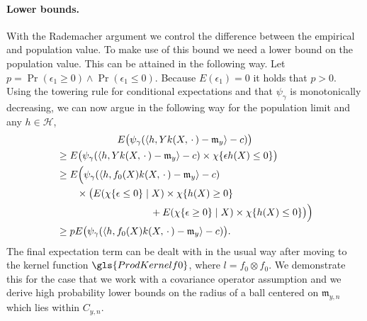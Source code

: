 \documentclass[10pt]{amsart}
\theoremstyle{definition}\newtheorem{defi}[theo]{Definition}\newtheorem{rema}[theo]{Remark}\newtheorem{exam}[theo]{Example}\newtheorem{exem}[theo]{Example}\newtheorem{nota}[theo]{Notation}
\theoremstyle{remark}
\newcommand{\cH}{\mathcal{H}}
\newcommand{\mean}{\mathfrak{m}}
\begin{document}
\paragraph{Lower bounds.} With the Rademacher argument we control the difference between the empirical and population value. To make use of this bound we need a lower bound on the population value. This can be attained in the following way. Let $p = \Pr(\epsilon_1 \geq 0) \wedge \Pr(\epsilon_1 \leq 0)$. Because $E(\epsilon_1) = 0$ it holds that $p >0$. Using the towering rule for conditional expectations and that $\psi_\gamma$ is monotonically decreasing, we can now argue in the following way for the population limit and any $h\in \cH$,
\begin{multline}\label{eq:lower_bnd_with_p}
E\bigl(\psi_\gamma(\langle h, Y k(X,\,\cdot\,) - \mean_y \rangle - c)\bigr)  \\
\begin{aligned}
&\geq E\bigl(\psi_\gamma(\langle h, Y k(X,\,\cdot\,) - \mean_y \rangle - c) \times \chi\{\epsilon h(X) \leq 0 \}\bigr)  \\
&\geq E\Bigl(\psi_\gamma(\langle h, f_0(X) k(X,\,\cdot\,) - \mean_y \rangle - c) \\
&%
\qquad
 \times\bigl(E(\chi\{\epsilon \leq 0 \}\mid X)
\times \chi\{h(X) \geq 0\}\\
&\mkern170mu 
+ E(\chi\{ \epsilon \geq 0 \}\mid X) \times \chi\{h(X) \leq 0\}\bigr)\Bigr)  \\
&\geq p E\bigl(\psi_\gamma(\langle h, f_0(X) k(X,\,\cdot\,) - \mean_y \rangle - c)\bigr).
\end{aligned}
\end{multline}
The final expectation term can be dealt with in the usual way after moving to the kernel function $\gls{ProdKernelf0}$, where $l = f_0 \otimes f_0$. We demonstrate this for the case that we work with a covariance operator assumption and we derive high probability lower bounds on the radius of a ball centered on $\mean_{y,n}$ which lies within $C_{y,n}$.
\end{document}
